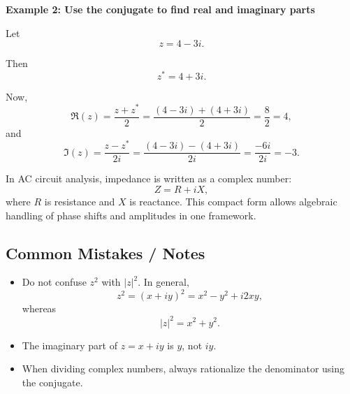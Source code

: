 \begin{examplebox}
    \textbf{Example 2: Use the conjugate to find real and imaginary parts}

    Let
    \[
        z=4-3i.
    \]

    Then
    \[
        z^*=4+3i.
    \]

    Now,
    \[
        \Re(z)=\frac{z+z^*}{2}
        =
        \frac{(4-3i)+(4+3i)}{2}
        =
        \frac{8}{2}=4,
    \]
    and
    \[
        \Im(z)=\frac{z-z^*}{2i}
        =
        \frac{(4-3i)-(4+3i)}{2i}
        =
        \frac{-6i}{2i}=-3.
    \]
\end{examplebox}

\begin{noteBox}
    In AC circuit analysis, impedance is written as a complex number:
    \[
        Z=R+iX,
    \]
    where $R$ is resistance and $X$ is reactance. This compact form allows algebraic handling of phase shifts and amplitudes in one framework.
\end{noteBox}

\subsection*{Common Mistakes / Notes}

\begin{itemize}
    \item Do not confuse $z^2$ with $|z|^2$. In general,
          \[
              z^2=(x+iy)^2=x^2-y^2+i2xy,
          \]
          whereas
          \[
              |z|^2=x^2+y^2.
          \]
    \item The imaginary part of $z=x+iy$ is $y$, not $iy$.
    \item When dividing complex numbers, always rationalize the denominator using the conjugate.
\end{itemize}